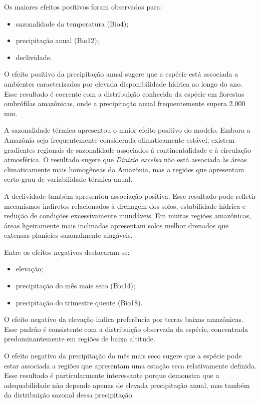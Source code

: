 Os maiores efeitos positivos foram observados para:

\begin{itemize}
	\item sazonalidade da temperatura (Bio4);
	\item precipitação anual (Bio12);
	\item declividade.
\end{itemize}

O efeito positivo da precipitação anual sugere que a espécie está associada a ambientes caracterizados por elevada disponibilidade hídrica ao longo do ano. Esse resultado é coerente com a distribuição conhecida da espécie em florestas ombrófilas amazônicas, onde a precipitação anual frequentemente supera 2.000 mm.

A sazonalidade térmica apresentou o maior efeito positivo do modelo. Embora a Amazônia seja frequentemente considerada climaticamente estável, existem gradientes regionais de sazonalidade associados à continentalidade e à circulação atmosférica. O resultado sugere que \textit{Dinizia excelsa} não está associada às áreas climaticamente mais homogêneas da Amazônia, mas a regiões que apresentam certo grau de variabilidade térmica anual.

A declividade também apresentou associação positiva. Esse resultado pode refletir mecanismos indiretos relacionados à drenagem dos solos, estabilidade hídrica e redução de condições excessivamente inundáveis. Em muitas regiões amazônicas, áreas ligeiramente mais inclinadas apresentam solos melhor drenados que extensas planícies sazonalmente alagáveis.

Entre os efeitos negativos destacaram-se:

\begin{itemize}
	\item elevação;
	\item precipitação do mês mais seco (Bio14);
	\item precipitação do trimestre quente (Bio18).
\end{itemize}

O efeito negativo da elevação indica preferência por terras baixas amazônicas. Esse padrão é consistente com a distribuição observada da espécie, concentrada predominantemente em regiões de baixa altitude.

O efeito negativo da precipitação do mês mais seco sugere que a espécie pode estar associada a regiões que apresentam uma estação seca relativamente definida. Esse resultado é particularmente interessante porque demonstra que a adequabilidade não depende apenas de elevada precipitação anual, mas também da distribuição sazonal dessa precipitação.

